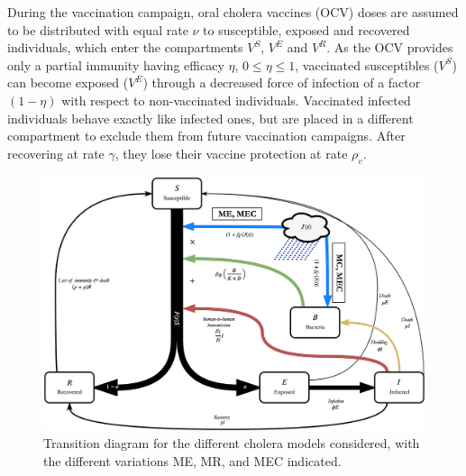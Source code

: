 During the vaccination campaign, oral cholera vaccines (OCV) doses are assumed to be distributed with equal rate $\nu$ to susceptible, exposed and recovered individuals, which enter the compartments $V^S$, $V^E$ and $V^R$. As the OCV provides only a partial immunity having efficacy $\eta$, $0\leq \eta \leq 1$, vaccinated susceptibles ($V^S$) can become exposed ($V^E$) through a decreased force of infection of a factor $(1-\eta)$ with respect to non-vaccinated individuals. Vaccinated infected individuals behave exactly like infected ones, but are placed in a different compartment to exclude them from future vaccination campaigns. After recovering at  rate $\gamma$, they lose their vaccine protection at rate $\rho_{v}$.
\begin{figure}
  \centering
  \includegraphics[width=\textwidth]{fig_cholera-rainfall/Lemaitre_ACTROP_2018_42_R1_fig1.png}
  \caption[Transition diagram for the competing cholera models]{Transition diagram for the different cholera models considered, with the different variations \textsc{ME}, \textsc{MR}, and \textsc{MEC} indicated.}
  \label{diagram}
\end{figure}

